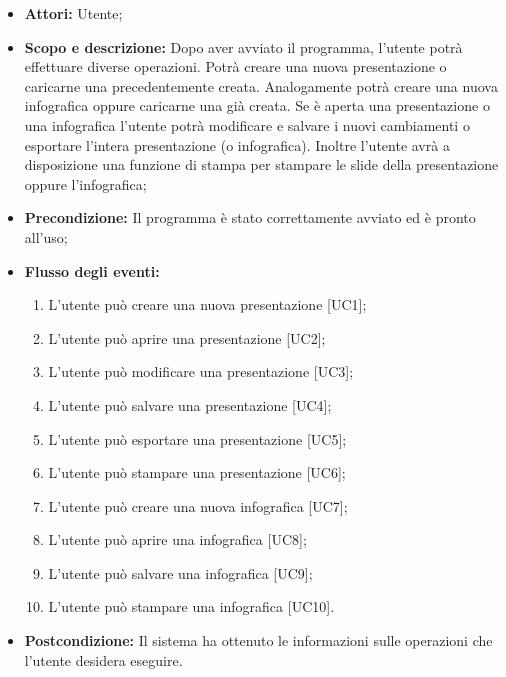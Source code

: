 \begin{itemize}
	\item \textbf{Attori:} Utente;
	\item \textbf{Scopo e descrizione:} Dopo aver avviato il programma, l'utente potrà effettuare diverse operazioni. Potrà creare una nuova presentazione o caricarne una precedentemente creata. Analogamente potrà creare una nuova infografica oppure caricarne una già creata. Se è aperta una presentazione o una infografica l'utente potrà modificare e salvare i nuovi cambiamenti o esportare l'intera presentazione (o infografica). Inoltre l'utente avrà a disposizione una funzione di stampa per stampare le slide della presentazione oppure l'infografica;
	\item \textbf{Precondizione:} Il programma è stato correttamente avviato ed è pronto all'uso;
	\item \textbf{Flusso degli eventi:}
	\begin{enumerate}
		\item L'utente può creare una nuova presentazione [UC1];
		\item L'utente può aprire una presentazione [UC2];
		\item L'utente può modificare una presentazione [UC3];
		\item L'utente può salvare una presentazione [UC4];
		\item L'utente può esportare una presentazione [UC5];
		\item L'utente può stampare una presentazione [UC6];
		\item L'utente può creare una nuova infografica [UC7];
		\item L'utente può aprire una infografica [UC8];
		\item L'utente può salvare una infografica [UC9];
		\item L'utente può stampare una infografica [UC10].
	\end{enumerate}
	\item \textbf{Postcondizione:} Il sistema ha ottenuto le informazioni sulle operazioni che l’utente desidera eseguire.
\end{itemize}



%

%

%

